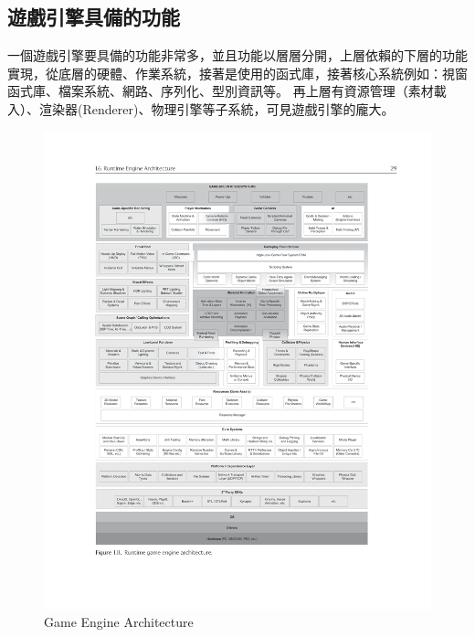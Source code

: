 \subsection{遊戲引擎具備的功能}

一個遊戲引擎要具備的功能非常多，並且功能以層層分開，上層依賴的下層的功能實現，從底層的硬體、作業系統，接著是使用的函式庫，接著核心系統例如：視窗函式庫、檔案系統、網路、序列化、型別資訊等。
再上層有資源管理（素材載入）、渲染器(Renderer)、物理引擎等子系統，可見遊戲引擎的龐大。 \cite{Gregory.2018}

\begin{figure}[h]
    \begin{center}
    \includegraphics[width=\textwidth]{./resources/engine_arch.png}
    \end{center}
\caption{Game Engine Architecture}
\label{fig:EngineArch}
\end{figure}

\newpage
